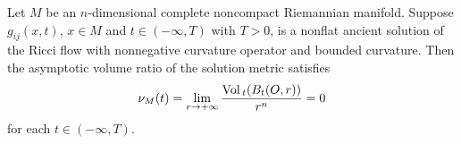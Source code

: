 \begin{lemma} 
  \label{lem:cz-ancient-solution-asymptotic-volume-ratio-zero}

Let $M$ be an $n$-dimensional complete noncompact Riemannian
manifold. Suppose $g_{ij}(x,t)$, $x\in M$ and $t\in(-\infty,T)$
with $T>0$, is a nonflat ancient solution of the Ricci flow with
nonnegative curvature operator and bounded curvature. Then the
asymptotic volume ratio of the solution metric satisfies
$$
\nu_M(t)=\lim_{r\rightarrow+\infty}\frac{{\rm Vol}\,_t(B_t(O,r))}{r^n}=0
$$
for each $t\in(-\infty,T)$.
\end{lemma}

